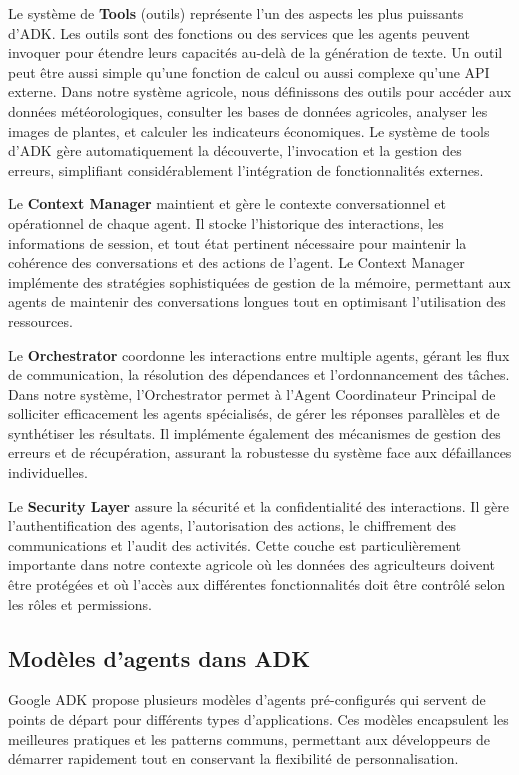 Le système de \textbf{Tools} (outils) représente l'un des aspects les plus puissants d'ADK. Les outils sont des fonctions ou des services que les agents peuvent invoquer pour étendre leurs capacités au-delà de la génération de texte. Un outil peut être aussi simple qu'une fonction de calcul ou aussi complexe qu'une API externe. Dans notre système agricole, nous définissons des outils pour accéder aux données météorologiques, consulter les bases de données agricoles, analyser les images de plantes, et calculer les indicateurs économiques. Le système de tools d'ADK gère automatiquement la découverte, l'invocation et la gestion des erreurs, simplifiant considérablement l'intégration de fonctionnalités externes.

Le \textbf{Context Manager} maintient et gère le contexte conversationnel et opérationnel de chaque agent. Il stocke l'historique des interactions, les informations de session, et tout état pertinent nécessaire pour maintenir la cohérence des conversations et des actions de l'agent. Le Context Manager implémente des stratégies sophistiquées de gestion de la mémoire, permettant aux agents de maintenir des conversations longues tout en optimisant l'utilisation des ressources.

Le \textbf{Orchestrator} coordonne les interactions entre multiple agents, gérant les flux de communication, la résolution des dépendances et l'ordonnancement des tâches. Dans notre système, l'Orchestrator permet à l'Agent Coordinateur Principal de solliciter efficacement les agents spécialisés, de gérer les réponses parallèles et de synthétiser les résultats. Il implémente également des mécanismes de gestion des erreurs et de récupération, assurant la robustesse du système face aux défaillances individuelles.

Le \textbf{Security Layer} assure la sécurité et la confidentialité des interactions. Il gère l'authentification des agents, l'autorisation des actions, le chiffrement des communications et l'audit des activités. Cette couche est particulièrement importante dans notre contexte agricole où les données des agriculteurs doivent être protégées et où l'accès aux différentes fonctionnalités doit être contrôlé selon les rôles et permissions.

\subsection{Modèles d'agents dans ADK}

Google ADK propose plusieurs modèles d'agents pré-configurés qui servent de points de départ pour différents types d'applications. Ces modèles encapsulent les meilleures pratiques et les patterns communs, permettant aux développeurs de démarrer rapidement tout en conservant la flexibilité de personnalisation.


